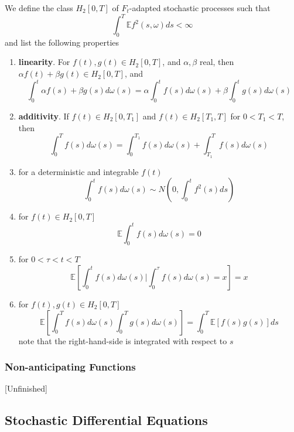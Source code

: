 \documentclass[12pt]{report}
\begin{document}
We define the class $H_2[0,T]$ of $F_t$-adapted stochastic processes such that 
\begin{equation*}
\int_0^T \mathbb{E}f^2(s,\omega)ds <\infty
\end{equation*}
and list the following properties
\begin{enumerate}
\item \textbf{linearity}. For $f(t),g(t)\in H_2[0,T]$, and $\alpha,\beta$ real, then $\alpha f(t)+\beta g(t) \in H_2[0,T]$, and 
\begin{equation*}
\int_0^t \alpha f(s)+\beta g(s) d\omega(s) = \alpha \int_0^t f(s)d\omega(s) +\beta \int_0^t g(s)d\omega(s)
\end{equation*}
\item \textbf{additivity}. If $f(t)\in H_2[0,T_1]$ and $f(t)\in H_2[T_1,T]$ for $0<T_1<T$, then 
\begin{equation*}
\int_0^Tf(s)d\omega(s) = \int_0^{T_1}f(s)d\omega(s) +\int_{T_1}^T f(s)d\omega(s)
\end{equation*}
\item for a deterministic and integrable $f(t)$
\begin{equation*}
\int_0^t f(s)d\omega(s) \sim N\left(0,\int_0^t f^2(s)ds\right)
\end{equation*}
\item for $f(t)\in H_2[0,T]$
\begin{equation*}
\mathbb{E}\int_0^t f(s)d\omega(s) = 0
\end{equation*}
\item for $0<\tau<t<T$  
\begin{equation*}
\mathbb{E}\left[\int_0^t f(s)d\omega(s)  | \int_0^\tau f(s)d\omega(s)=x \right] =x 
\end{equation*}
\item for $f(t),g(t)\in H_2[0,T]$
\begin{equation*}
\mathbb{E}\left[\int_0^Tf(s)d\omega(s)\int_0^T g(s)d\omega(s)\right]=\int_0^T\mathbb{E}[f(s)g(s)]ds
\end{equation*}
note that the right-hand-side is integrated with respect to $s$
\end{enumerate}
\subsubsection{Non-anticipating Functions}{[Unfinished]}

\subsection{Stochastic Differential Equations}
\end{document}

